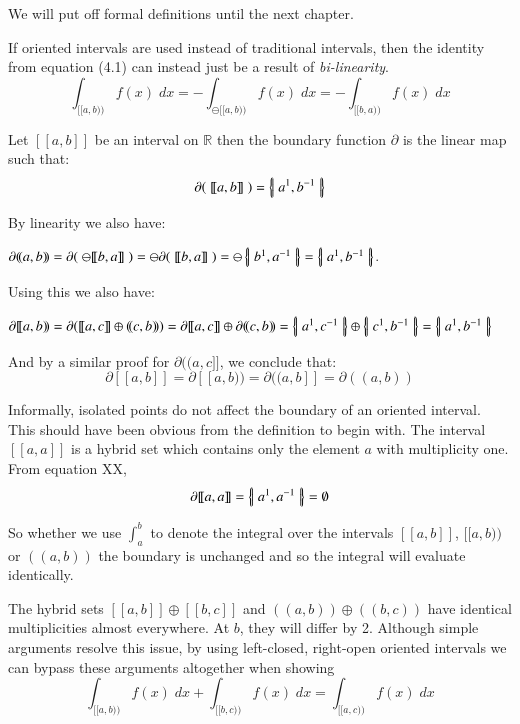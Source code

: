 We will put off formal definitions until the next chapter.

If oriented intervals are used instead of traditional intervals, then the identity from equation (4.1) can instead just be a result of \emph{bi-linearity}.
\begin{equation}
	\int_{[\![a,b)\!)} f(x) \; dx = - \int_{\ominus [\![a,b)\!)} f(x) \; dx = - \int_{[\![b,a)\!)} f(x) \; dx
\end{equation}


\begin{definition}
	Let $[\![ a,b ]\!]$ be an interval on $\mathbb{R}$ then the boundary function $\partial$ is the linear map such that:
	\begin{equation}
		\partial( \;[\![a,b]\!]\; ) = \left\{ \! \left| \;  a^1, b^{-1}  \; \right| \! \right\}
	\end{equation}
\end{definition}

By linearity we also have:

$\partial (\!(a,b)\!) = \partial ( \; \ominus [\![b,a]\!] \; )= \ominus \partial ( \; [\![b,a]\!] \; ) = \ominus \hset{ b^1, a^{-1} } = \hset{ a^1, b^{-1}}$.

Using this we also have:

$\partial [\![a,b)\!) = \partial ( [\![a,c]\!] \oplus (\!(c,b)\!) ) = \partial [\![a,c]\!] \oplus \partial (\!(c,b)\!) =  \hset{ a^1, c^{-1} } \oplus \hset{ c^1, b^{-1} } = \hset{a^1, b^{-1} }$

And by a similar proof for $\partial (\!(a,c]\!]$, we conclude that:
\begin{equation}
	\partial [\![a,b]\!] = \partial [\![a,b)\!) = \partial (\!(a,b]\!] = \partial (\!(a,b)\!)
\end{equation}


Informally, isolated points do not affect the boundary of an oriented interval.
This should have been obvious from the definition to begin with.
The interval $[\![ a,a ]\!]$ is a hybrid set which contains only the element $a$ with multiplicity one.
From equation XX,
\begin{equation}
	\partial [\![ a,a ]\!] = \left\{ \! \left| \; a^1, a^{-1} \; \right| \! \right\} = \emptyset
\end{equation}

So whether we use $\int_a^b$ to denote the integral over the intervals $[\![a,b]\!]$, $[\![a,b)\!)$ or  $(\!(a,b)\!)$ the boundary is unchanged and so the integral will evaluate identically.

The hybrid sets $[\![a,b]\!] \oplus [\![b,c]\!]$ and $(\!(a,b)\!) \oplus (\!(b,c)\!)$ have identical multiplicities almost everywhere.
At $b$, they will differ by 2. 
Although simple arguments resolve this issue, by using left-closed, right-open oriented intervals we can bypass these arguments altogether when showing
\begin{equation}
	\int_{[\![a,b)\!)} f(x) \; dx + \int_{[\![b,c)\!)} f(x) \; dx = \int_{[\![a,c)\!)} f(x) \; dx
\end{equation}

